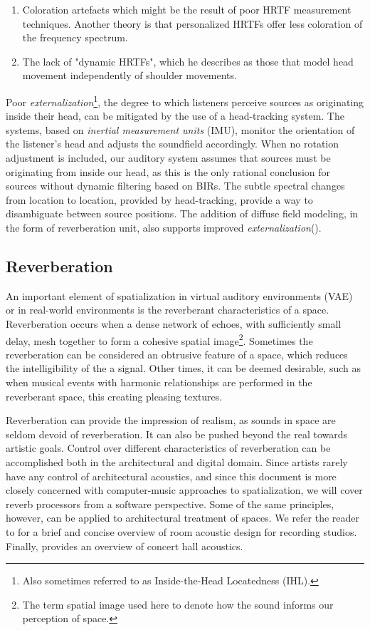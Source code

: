 \begin{enumerate}
    \item Coloration artefacts which might be the result of poor HRTF measurement techniques. Another theory is that personalized HRTFs offer less coloration of the frequency spectrum.
    \item The lack of "dynamic HRTFs", which he describes as those that model head movement independently of shoulder movements. 
\end{enumerate}

Poor \textit{externalization}\footnote{Also sometimes referred to as Inside-the-Head Locatedness (IHL).}, the degree to which listeners perceive sources as originating inside their head, can be mitigated by the use of a head-tracking system. The systems, based on \textit{inertial measurement units} (IMU), monitor the orientation of the listener's head and adjusts the soundfield accordingly. When no rotation adjustment is included, our auditory system assumes that sources must be originating from inside our head, as this is the only rational conclusion for sources without dynamic filtering based on BIRs. The subtle spectral changes from location to location, provided by head-tracking, provide a way to disambiguate between source positions. The addition of diffuse field modeling, in the form of reverberation unit, also supports improved \textit{externalization}(\cite{sakamoto1976out}). 

\subsection{Reverberation}

An important element of spatialization in virtual auditory environments (VAE) or in real-world environments is the reverberant characteristics of a space. Reverberation occurs when a dense network of echoes, with sufficiently small delay, mesh together to form a cohesive spatial image\footnote{The term spatial image used here to denote how the sound informs our perception of space.}. Sometimes the reverberation can be considered an obtrusive feature of a space, which reduces the intelligibility of the a signal. Other times, it can be deemed desirable, such as when musical events with harmonic relationships are performed in the reverberant space, this creating pleasing textures. 

Reverberation can provide the impression of realism, as sounds in space are seldom devoid of reverberation. It can also be pushed beyond the real towards artistic goals. Control over different characteristics of reverberation can be accomplished both in the architectural and digital domain. Since artists rarely have any control of architectural acoustics, and since this document is more closely concerned with computer-music approaches to spatialization, we will cover reverb processors from a software perspective. Some of the same principles, however, can be applied to architectural treatment of spaces. We refer the reader to \cite{gupta2019analysis} for a brief and concise overview of room acoustic design for recording studios. Finally, \cite{beranek1992concert} provides an overview of concert hall acoustics. 

